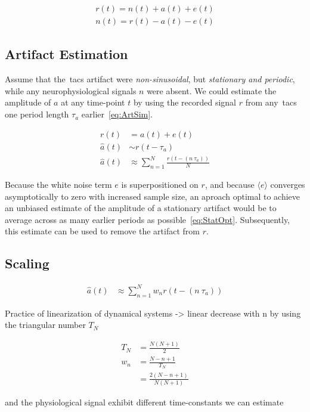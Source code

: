 \documentclass[a4paper]{article}
\begin{document}
\begin{eqnarray}
    r(t) = n(t) + a(t) + e(t)\\
    n(t) = r(t) - a(t) - e(t)
\end{eqnarray}

\subsection{Artifact Estimation}
Assume that the~\gls{tacs} artifact were \emph{non-sinusoidal}, but \emph{stationary and periodic}, while any neurophysiological signals $n$ were absent. We could estimate the amplitude of $a$ at any time-point $t$ by using the recorded signal $r$ from any~\gls{tacs} one period length $\tau_a$ earlier~\eqref{eq:ArtSim}.

\begin{align}
    r(t) & = a(t) + e(t)\\
    \hat{a}(t) & \sim r(t-\tau_a)\label{eq:ArtSim}\\
    \hat{a}(t) & \approx \sum_{n=1}^{N} \frac{r(t - (n~\tau_a))}{N}\label{eq:StatOpt}
\end{align}

Because the white noise term $e$ is superpositioned on $r$, and because $\langle e\rangle$ converges asymptotically to zero with increased sample size, an aproach optimal to achieve an unbiased estimate of the amplitude of a stationary artifact would be to average across as many earlier periods as possible~\eqref{eq:StatOpt}. Subsequently, this estimate can be used to  remove the artifact from $r$.

\subsection{Scaling}


\begin{align}
    \hat{a}(t) & \approx \sum_{n=1}^{N} w_n r(t - (n~\tau_a))\label{eq:Weighted}
\end{align}

Practice of linearization of dynamical systems -> linear decrease with n
by using  the triangular number $T_N$

\begin{align}
    T_N & = \frac{N(N+1)}{2}\\
    w_n & = \frac{N-n+1}{T_N}\\
        & = \frac{2(N-n+1)}{N(N+1)}
\end{align}

and the physiological signal exhibit different time-constants
 we can estimate
\end{document}
